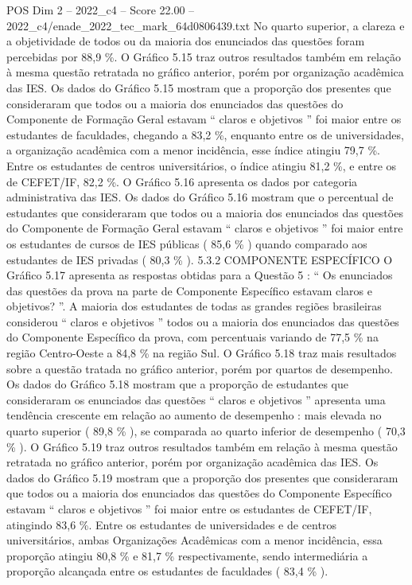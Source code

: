 \begin{textsample}{POS Dim 2 – 2022\_c4 – Score 22.00 – 2022\_c4/enade\_2022\_tec\_mark\_64d0806439.txt}
No quarto superior, a clareza e a objetividade de todos ou da maioria dos enunciados das questões foram percebidas por 88,9 \%.
O Gráfico 5.15 traz outros resultados também em relação à mesma questão retratada no gráfico anterior, porém por organização acadêmica das IES.
Os dados do Gráfico 5.15 mostram que a proporção dos presentes que consideraram que todos ou a maioria dos enunciados das questões do Componente de Formação Geral estavam “ claros e objetivos ” foi maior entre os estudantes de faculdades, chegando a 83,2 \%, enquanto entre os de universidades, a organização acadêmica com a menor incidência, esse índice atingiu 79,7 \%.
Entre os estudantes de centros universitários, o índice atingiu 81,2 \%, e entre os de CEFET/IF, 82,2 \%.
O Gráfico 5.16 apresenta os dados por categoria administrativa das IES.
Os dados do Gráfico 5.16 mostram que o percentual de estudantes que consideraram que todos ou a maioria dos enunciados das questões do Componente de Formação Geral estavam “ claros e objetivos ” foi maior entre os estudantes de cursos de IES públicas ( 85,6 \% ) quando comparado aos estudantes de IES privadas ( 80,3 \% ). 5.3.2 COMPONENTE ESPECÍFICO O Gráfico 5.17 apresenta as respostas obtidas para a Questão 5 : “ Os enunciados das questões da prova na parte de Componente Específico estavam claros e objetivos? ”.
A maioria dos estudantes de todas as grandes regiões brasileiras considerou “ claros e objetivos ” todos ou a maioria dos enunciados das questões do Componente Específico da prova, com percentuais variando de 77,5 \% na região Centro-Oeste a 84,8 \% na região Sul.
O Gráfico 5.18 traz mais resultados sobre a questão tratada no gráfico anterior, porém por quartos de desempenho.
Os dados do Gráfico 5.18 mostram que a proporção de estudantes que consideraram os enunciados das questões “ claros e objetivos ” apresenta uma tendência crescente em relação ao aumento de desempenho : mais elevada no quarto superior ( 89,8 \% ), se comparada ao quarto inferior de desempenho ( 70,3 \% ).
O Gráfico 5.19 traz outros resultados também em relação à mesma questão retratada no gráfico anterior, porém por organização acadêmica das IES.
Os dados do Gráfico 5.19 mostram que a proporção dos presentes que consideraram que todos ou a maioria dos enunciados das questões do Componente Específico estavam “ claros e objetivos ” foi maior entre os estudantes de CEFET/IF, atingindo 83,6 \%.
Entre os estudantes de universidades e de centros universitários, ambas Organizações Acadêmicas com a menor incidência, essa proporção atingiu 80,8 \% e 81,7 \% respectivamente, sendo intermediária a proporção alcançada entre os estudantes de faculdades ( 83,4 \% ).

\end{textsample}
